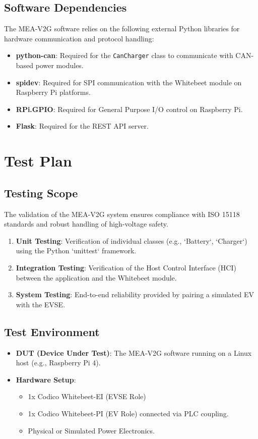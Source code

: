 \documentclass[a4paper,11pt]{report}
\begin{document}
\section{Software Dependencies}
The MEA-V2G software relies on the following external Python libraries for hardware communication and protocol handling:
\begin{itemize}
    \item \textbf{python-can}: Required for the \texttt{CanCharger} class to communicate with CAN-based power modules.
    \item \textbf{spidev}: Required for SPI communication with the Whitebeet module on Raspberry Pi platforms.
    \item \textbf{RPi.GPIO}: Required for General Purpose I/O control on Raspberry Pi.
    \item \textbf{Flask}: Required for the REST API server.
\end{itemize}

\chapter{Test Plan}

\section{Testing Scope}
The validation of the MEA-V2G system ensures compliance with ISO 15118 standards and robust handling of high-voltage safety.
\begin{enumerate}
    \item \textbf{Unit Testing}: Verification of individual classes (e.g., `Battery`, `Charger`) using the Python `unittest` framework.
    \item \textbf{Integration Testing}: Verification of the Host Control Interface (HCI) between the application and the Whitebeet module.
    \item \textbf{System Testing}: End-to-end reliability provided by pairing a simulated EV with the EVSE.
\end{enumerate}

\section{Test Environment}
\begin{itemize}
    \item \textbf{DUT (Device Under Test)}: The MEA-V2G software running on a Linux host (e.g., Raspberry Pi 4).
    \item \textbf{Hardware Setup}:
        \begin{itemize}
            \item 1x Codico Whitebeet-EI (EVSE Role)
            \item 1x Codico Whitebeet-PI (EV Role) connected via PLC coupling.
            \item Physical or Simulated Power Electronics.
        \end{itemize}
\end{itemize}
\end{document}
